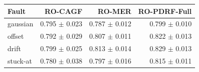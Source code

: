 \begin{tabular}{lrrr}
\toprule
Fault & RO-CAGF & RO-MER & RO-PDRF-Full \\
\midrule
gaussian & 0.795 $\pm$ 0.023 & 0.787 $\pm$ 0.012 & 0.799 $\pm$ 0.010 \\
offset & 0.792 $\pm$ 0.029 & 0.807 $\pm$ 0.011 & 0.822 $\pm$ 0.013 \\
drift & 0.799 $\pm$ 0.025 & 0.813 $\pm$ 0.014 & 0.829 $\pm$ 0.013 \\
stuck-at & 0.780 $\pm$ 0.038 & 0.797 $\pm$ 0.016 & 0.815 $\pm$ 0.011 \\
\bottomrule
\end{tabular}